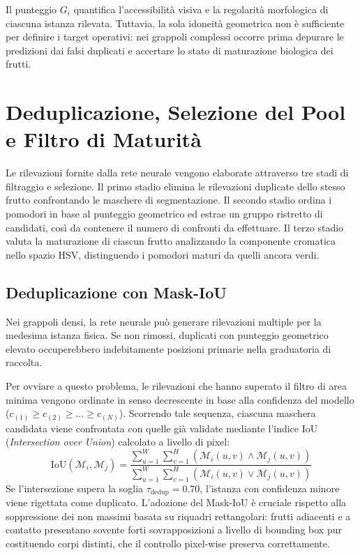 Il punteggio $G_i$ quantifica l'accessibilità visiva e la regolarità morfologica di ciascuna istanza rilevata. Tuttavia, la sola idoneità geometrica non è sufficiente per definire i target operativi: nei grappoli complessi occorre prima depurare le predizioni dai falsi duplicati e accertare lo stato di maturazione biologica dei frutti.

\section{Deduplicazione, Selezione del Pool e Filtro di Maturità}
\label{sec:deduplicazione_maturita}

Le rilevazioni fornite dalla rete neurale vengono elaborate attraverso tre stadi di filtraggio e selezione. Il primo stadio elimina le rilevazioni duplicate dello stesso frutto confrontando le maschere di segmentazione. Il secondo stadio ordina i pomodori in base al punteggio geometrico ed estrae un gruppo ristretto di candidati, così da contenere il numero di confronti da effettuare. Il terzo stadio valuta la maturazione di ciascun frutto analizzando la componente cromatica nello spazio HSV, distinguendo i pomodori maturi da quelli ancora verdi.

\subsection{Deduplicazione con Mask-IoU}
\label{subsec:mask_nms}

Nei grappoli densi, la rete neurale può generare rilevazioni multiple per la medesima istanza fisica. Se non rimossi, duplicati con punteggio geometrico elevato occuperebbero indebitamente posizioni primarie nella graduatoria di raccolta.

Per ovviare a questo problema, le rilevazioni che hanno superato il filtro di area minima vengono ordinate in senso decrescente in base alla confidenza del modello ($c_{(1)} \ge c_{(2)} \ge \dots \ge c_{(N)}$). Scorrendo tale sequenza, ciascuna maschera candidata viene confrontata con quelle già validate mediante l'indice IoU (\textit{Intersection over Union}) calcolato a livello di pixel:
\begin{equation}
    \text{IoU}(\mathcal{M}_i, \mathcal{M}_j) = \frac{\sum_{u=1}^{W} \sum_{v=1}^{H} \left( \mathcal{M}_i(u, v) \land \mathcal{M}_j(u, v) \right)}{\sum_{u=1}^{W} \sum_{v=1}^{H} \left( \mathcal{M}_i(u, v) \lor \mathcal{M}_j(u, v) \right)}
    \label{eq:mask_iou}
\end{equation}
Se l'intersezione supera la soglia $\tau_{\text{dedup}} = 0.70$, l'istanza con confidenza minore viene rigettata come duplicato. L'adozione del Mask-IoU è cruciale rispetto alla soppressione dei non massimi basata su riquadri rettangolari: frutti adiacenti e a contatto presentano sovente forti sovrapposizioni a livello di bounding box pur costituendo corpi distinti, che il controllo pixel-wise preserva correttamente.

